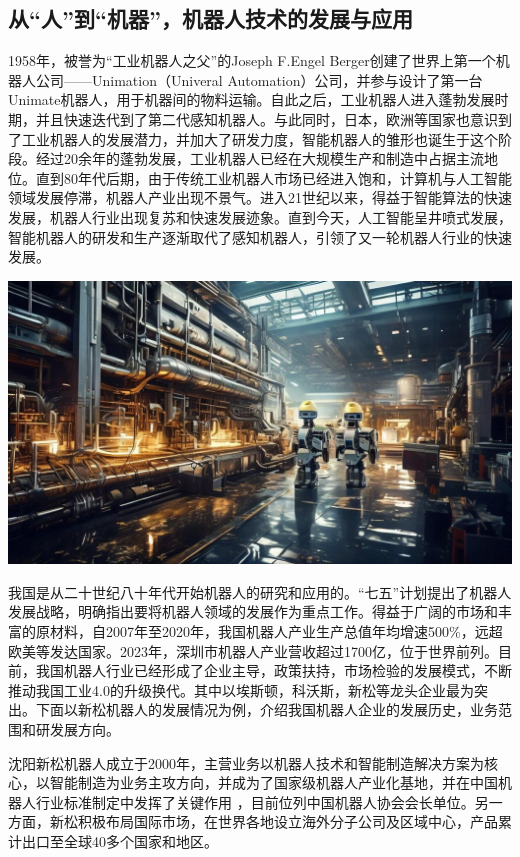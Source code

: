 \subsection{从“人”到“机器”，机器人技术的发展与应用}

1958年，被誉为“工业机器人之父”的Joseph F.Engel Berger创建了世界上第一个机器人公司——Unimation（Univeral Automation）公司，并参与设计了第一台Unimate机器人，用于机器间的物料运输。自此之后，工业机器人进入蓬勃发展时期，并且快速迭代到了第二代感知机器人。与此同时，日本，欧洲等国家也意识到了工业机器人的发展潜力，并加大了研发力度，智能机器人的雏形也诞生于这个阶段。经过20余年的蓬勃发展，工业机器人已经在大规模生产和制造中占据主流地位。直到80年代后期，由于传统工业机器人市场已经进入饱和，计算机与人工智能领域发展停滞，机器人产业出现不景气。进入21世纪以来，得益于智能算法的快速发展，机器人行业出现复苏和快速发展迹象。直到今天，人工智能呈井喷式发展，智能机器人的研发和生产逐渐取代了感知机器人，引领了又一轮机器人行业的快速发展。

\begin{marginfigure}
    \includegraphics{images/industry_4.JPEG}
\end{marginfigure}

我国是从二十世纪八十年代开始机器人的研究和应用的。“七五”计划提出了机器人发展战略，明确指出要将机器人领域的发展作为重点工作。得益于广阔的市场和丰富的原材料，自2007年至2020年，我国机器人产业生产总值年均增速500\%，远超欧美等发达国家。2023年，深圳市机器人产业营收超过1700亿，位于世界前列。目前，我国机器人行业已经形成了企业主导，政策扶持，市场检验的发展模式，不断推动我国工业4.0的升级换代。其中以埃斯顿，科沃斯，新松等龙头企业最为突出。下面以新松机器人的发展情况为例，介绍我国机器人企业的发展历史，业务范围和研发展方向。

沈阳新松机器人成立于2000年，主营业务以机器人技术和智能制造解决方案为核心，以智能制造为业务主攻方向，并成为了国家级机器人产业化基地，并在中国机器人行业标准制定中发挥了关键作用 ，目前位列中国机器人协会会长单位。另一方面，新松积极布局国际市场，在世界各地设立海外分子公司及区域中心，产品累计出口至全球40多个国家和地区。

